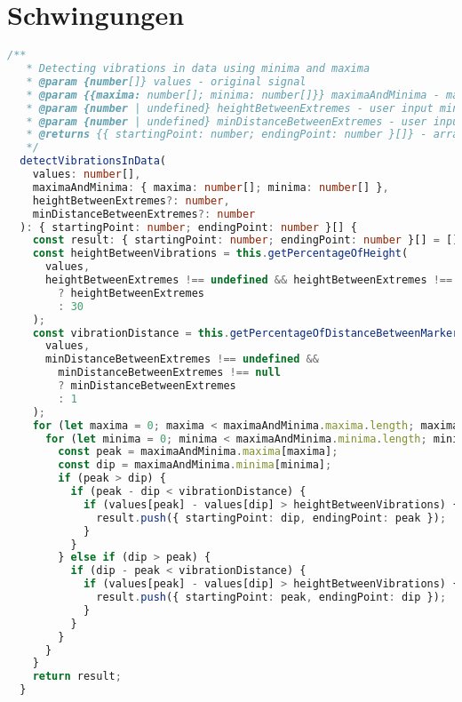 \section{Schwingungen}\label{appendix:trend-detection-code:schwingungen}
\begin{lstlisting}[language=Typescript]
  /**
   * Detecting vibrations in data using minima and maxima
   * @param {number[]} values - original signal
   * @param {{maxima: number[]; minima: number[]}} maximaAndMinima - maxima and minima of original signal
   * @param {number | undefined} heightBetweenExtremes - user input min height between extremes
   * @param {number | undefined} minDistanceBetweenExtremes - user input min distance between extremes
   * @returns {{ startingPoint: number; endingPoint: number }[]} - array of start and end indices of vibrations
   */
  detectVibrationsInData(
    values: number[],
    maximaAndMinima: { maxima: number[]; minima: number[] },
    heightBetweenExtremes?: number,
    minDistanceBetweenExtremes?: number
  ): { startingPoint: number; endingPoint: number }[] {
    const result: { startingPoint: number; endingPoint: number }[] = [];
    const heightBetweenVibrations = this.getPercentageOfHeight(
      values,
      heightBetweenExtremes !== undefined && heightBetweenExtremes !== null
        ? heightBetweenExtremes
        : 30
    );
    const vibrationDistance = this.getPercentageOfDistanceBetweenMarkers(
      values,
      minDistanceBetweenExtremes !== undefined &&
        minDistanceBetweenExtremes !== null
        ? minDistanceBetweenExtremes
        : 1
    );
    for (let maxima = 0; maxima < maximaAndMinima.maxima.length; maxima++) {
      for (let minima = 0; minima < maximaAndMinima.minima.length; minima++) {
        const peak = maximaAndMinima.maxima[maxima];
        const dip = maximaAndMinima.minima[minima];
        if (peak > dip) {
          if (peak - dip < vibrationDistance) {
            if (values[peak] - values[dip] > heightBetweenVibrations) {
              result.push({ startingPoint: dip, endingPoint: peak });
            }
          }
        } else if (dip > peak) {
          if (dip - peak < vibrationDistance) {
            if (values[peak] - values[dip] > heightBetweenVibrations) {
              result.push({ startingPoint: peak, endingPoint: dip });
            }
          }
        }
      }
    }
    return result;
  }
\end{lstlisting}
